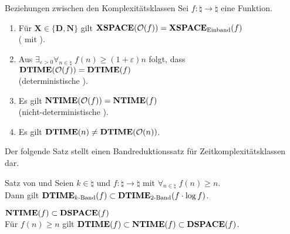 \begin{Satz}{Beziehungen zwischen den Komplexitätsklassen}
    Sei $f\colon \natural \rightarrow \natural$ eine Funktion.
    \begin{enumerate}
        \item
        Für $\mathbf{X} \in \{\mathbf{D}, \mathbf{N}\}$ gilt
        $\mathbf{XSPACE}(\mathcal{O}(f)) = \mathbf{XSPACE}_{\text{Einband}}(f)$\\
        ( mit ).

        \item
        Aus $\exists_{\varepsilon > 0} \forall_{n \in \natural}\; f(n) \ge (1 + \varepsilon) n$
        folgt, dass $\mathbf{DTIME}(\mathcal{O}(f)) = \mathbf{DTIME}(f)$\\
        (deterministische ).

        \item
        Es gilt $\mathbf{NTIME}(\mathcal{O}(f)) = \mathbf{NTIME}(f)$\\
        (nicht-deterministische ).

        \item
        Es gilt $\mathbf{DTIME}(n) \not= \mathbf{DTIME}(\mathcal{O}(n))$.
    \end{enumerate}
\end{Satz}

\linie

\begin{Bem}
    Der folgende Satz stellt einen Bandreduktionssatz für Zeitkomplexitätsklassen dar.
\end{Bem}

\begin{Satz}{Satz von  und }
    Seien $k \in \natural$ und $f\colon \natural \rightarrow \natural$ mit
    $\forall_{n \in \natural}\; f(n) \ge n$.\\
    Dann gilt $\mathbf{DTIME}_{k\text{-Band}}(f) \subset \mathbf{DTIME}_{2\text{-Band}}(f \cdot \log f)$.
\end{Satz}

\linie
\pagebreak

\begin{Satz}{$\mathbf{NTIME}(f) \subset \mathbf{DSPACE}(f)$}\\
    Für $f(n) \ge n$ gilt $\mathbf{DTIME}(f) \subset \mathbf{NTIME}(f) \subset \mathbf{DSPACE}(f)$.
\end{Satz}

